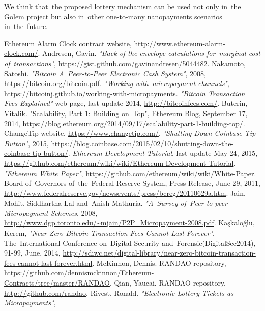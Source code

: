 \documentclass[a4paper]{article}
\begin{document}
    We think that~the proposed lottery mechanism can be used not only in~the Golem project but also in~other
    one-to-many nanopayments scenarios in~the~future.

\begin{thebibliography}{9}
 Ethereum Alarm Clock contract website, \url{http://www.ethereum-alarm-clock.com/}.
 Andresen, Gavin. \textit{"Back-of-the-envelope calculations for~marginal cost of~transactions"},
    \url{https://gist.github.com/gavinandresen/5044482}.
 Nakamoto, Satoshi. \textit{"Bitcoin A~Peer-to-Peer Electronic Cash System"}, 2008,
    \url{https://bitcoin.org/bitcoin.pdf}.
 \textit{"Working with~micropayment channels"},
    \url{https://bitcoinj.github.io/working-with-micropayments}.
 \textit{"Bitcoin Transaction Fees Explained"} web page, last update 2014, \url{http://bitcoinfees.com/}.
 Buterin, Vitalik. "Scalability, Part 1: Building on~Top", Ethereum Blog, September 17, 2014,
    \url{https://blog.ethereum.org/2014/09/17/scalability-part-1-building-top/}.
 ChangeTip website, \url{https://www.changetip.com/}.
 \textit{"Shutting Down Coinbase Tip Button"}, 2015,
    \url{https://blog.coinbase.com/2015/02/10/shutting-down-the-coinbase-tip-button/}.
 \textit{Ethereum Development Tutorial}, last update May 24, 2015,
    \url{https://github.com/ethereum/wiki/wiki/Ethereum-Development-Tutorial}.
 \textit{"Ethereum White Paper"}, \url{https://github.com/ethereum/wiki/wiki/White-Paper}.
 Board of~Governors of~the~Federal Reserve System, Press Release, June 29, 2011,
    \url{http://www.federalreserve.gov/newsevents/press/bcreg/20110629a.htm}.
 Jain, Mohit, Siddhartha Lal and~Anish Mathuria. \textit{"A~Survey of~Peer-to-peer Micropayment Schemes},
    2008, \url{http://www.dgp.toronto.edu/~mjain/P2P_Micropayment-2008.pdf}.
Kaşkaloğlu, Kerem, \textit{"Near Zero Bitcoin Transaction Fees Cannot Last Forever"},
    The~International Conference on~Digital Security and~Forensic(DigitalSec2014), 91-99, June, 2014,
    \url{http://sdiwc.net/digital-library/near-zero-bitcoin-transaction-fees-cannot-last-forever.html}.
 McKinnon, Dennis. RANDAO repository,
    \url{https://github.com/dennismckinnon/Ethereum-Contracts/tree/master/RANDAO}.
 Qian, Yaucai. RANDAO repository, \url{http://github.com/randao}.
 Rivest, Ronald. \textit{"Electronic Lottery Tickets as Micropayments"},

\end{thebibliography}
\end{document}
